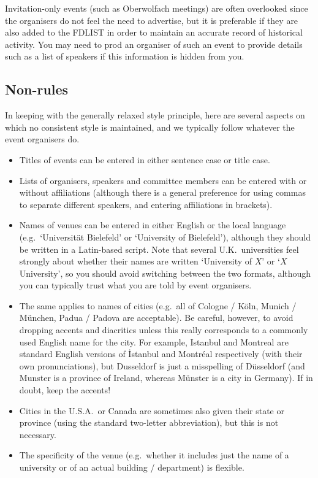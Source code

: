 \documentclass[12pt]{scrartcl}
\theoremstyle{definition}
\begin{document}
Invitation-only events (such as Oberwolfach meetings) are often overlooked since the organisers do not feel the need to advertise, but it is preferable if they are also added to the FDLIST in order to maintain an accurate record of historical activity.
You may need to prod an organiser of such an event to provide details such as a list of speakers if this information is hidden from you.

\subsection{Non-rules}
\label{s:non-rules}
In keeping with the generally relaxed style principle, here are several aspects on which no consistent style is maintained, and we typically follow whatever the event organisers do.

\begin{itemize}
\item Titles of events can be entered in either sentence case or title case.
\item Lists of organisers, speakers and committee members can be entered with or without affiliations (although there is a general preference for using commas to separate different speakers, and entering affiliations in brackets).
\item Names of venues can be entered in either English or the local language (e.g.\ `Universität Bielefeld' or `University of Bielefeld'), although they should be written in a Latin-based script. Note that several U.K.\ universities feel strongly about whether their names are written `University of $X$' or `$X$ University', so you should avoid switching between the two formats, although you can typically trust what you are told by event organisers.
\item The same applies to names of cities (e.g.\ all of Cologne / Köln, Munich / München, Padua / Padova are acceptable).
Be careful, however, to avoid dropping accents and diacritics unless this really corresponds to a commonly used English name for the city.
For example, Istanbul and Montreal are standard English versions of İstanbul and Montréal respectively (with their own pronunciations), but Dusseldorf is just a misspelling of Düsseldorf (and Munster is a province of Ireland, whereas Münster is a city in Germany).
If in doubt, keep the accents!
\item Cities in the U.S.A.\ or Canada are sometimes also given their state or province (using the standard two-letter abbreviation), but this is not necessary.
\item The specificity of the venue (e.g.\ whether it includes just the name of a university or of an actual building / department) is flexible.
\end{itemize}
\end{document}
